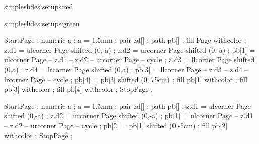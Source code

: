 \startsetups simpleslides:setups:red
\stopsetups

\startsetups simpleslides:setups:green
\stopsetups




StartPage ;
numeric a ; a = 1.5mm ;
pair zd[] ;
path pb[] ;
fill Page withcolor  ;
z.d1 = ulcorner Page shifted (0,-a) ;
z.d2 = urcorner Page shifted (0,-a) ;
pb[1] = ulcorner Page -- z.d1 -- z.d2 -- urcorner Page -- cycle ;
z.d3 = llcorner Page shifted (0,a) ;
z.d4 = lrcorner Page shifted (0,a) ;
pb[3] = llcorner Page -- z.d3 -- z.d4 -- lrcorner Page -- cycle ;
pb[4] = pb[3] shifted (0,.75cm) ;
fill pb[1] withcolor  ;
fill pb[3] withcolor  ;
fill pb[4] withcolor  ;
StopPage ;
\stopuniqueMPgraphic 

StartPage ;
numeric a ; a = 1.5mm ;
pair zd[] ;
path pb[] ;
z.d1 = ulcorner Page shifted (0,-a) ;
z.d2 = urcorner Page shifted (0,-a) ;
pb[1] = ulcorner Page -- z.d1 -- z.d2 -- urcorner Page -- cycle ;
pb[2] = pb[1] shifted (0,-2cm) ;
fill pb[2] withcolor  ;
StopPage ;
\stopuniqueMPgraphic


 

